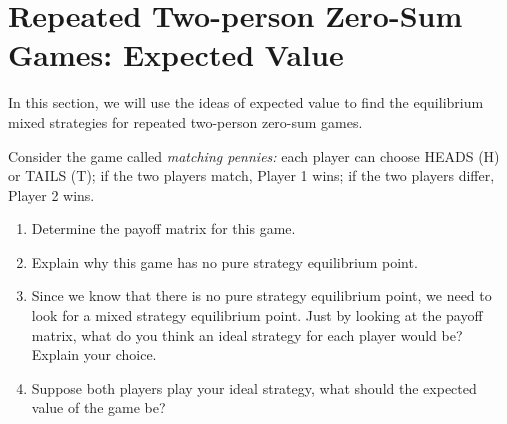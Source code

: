 
\section{Repeated Two-person Zero-Sum Games: Expected Value}



\vspace{.1in}
In this section, we will use the ideas of expected value to find the equilibrium mixed strategies for repeated  two-person zero-sum games. 




Consider the game called {\it matching pennies:} each player can choose HEADS (H) or TAILS (T); if the two players match, Player 1 wins; if the two players differ, Player 2 wins.

\begin{enumerate}
\item Determine the payoff matrix for this game. 
\vspace{.1in}

\item Explain why this game has no pure strategy equilibrium point.
\vspace{.1 in}

\item Since we know that there is no pure strategy equilibrium point, we need to look for a mixed strategy equilibrium point. Just by looking at the payoff matrix, what do you think an ideal strategy for each player would be? Explain your choice. 
\vspace{.1 in}

\item Suppose both players play your ideal strategy, what should the expected value of the game be?
\end{enumerate}


